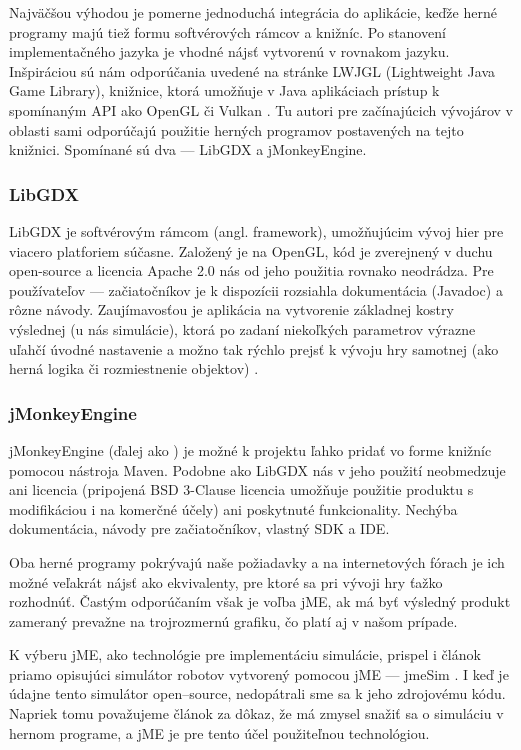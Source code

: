 Najväčšou výhodou je pomerne jednoduchá integrácia do aplikácie, keďže herné programy majú tiež formu softvérových rámcov a knižníc. Po stanovení implementačného jazyka je vhodné nájsť  vytvorenú v rovnakom jazyku. Inšpiráciou sú nám odporúčania uvedené na stránke LWJGL (Lightweight Java Game Library), knižnice, ktorá umožňuje v Java aplikáciach prístup k spomínaným API ako OpenGL či Vulkan \cite{LWJGL}. Tu autori pre začínajúcich vývojárov v oblasti sami odporúčajú použitie herných programov postavených na tejto knižnici. Spomínané sú dva --- LibGDX a jMonkeyEngine.

\subsubsection{LibGDX}
LibGDX je softvérovým rámcom (angl. framework), umožňujúcim vývoj hier pre viacero platforiem súčasne. Založený je na OpenGL, kód je zverejnený v duchu open-source a licencia Apache 2.0 nás od jeho použitia rovnako neodrádza. Pre používateľov --- začiatočníkov je k dispozícii rozsiahla dokumentácia (Javadoc) a rôzne návody. Zaujímavosťou je aplikácia na vytvorenie základnej kostry výslednej  (u nás simulácie), ktorá po zadaní niekoľkých parametrov výrazne uľahčí úvodné nastavenie a možno tak rýchlo prejsť k vývoju hry samotnej (ako herná logika či rozmiestnenie objektov) \cite{LibGDXProjectGenerator}.

\subsubsection{jMonkeyEngine}
jMonkeyEngine (ďalej ako ) je možné k projektu ľahko pridať vo forme knižníc pomocou nástroja Maven. Podobne ako LibGDX nás v jeho použití neobmedzuje ani licencia (pripojená BSD 3-Clause licencia umožňuje použitie produktu s modifikáciou i na komerčné účely) ani poskytnuté funkcionality. Nechýba dokumentácia, návody pre začiatočníkov, vlastný SDK a IDE.

Oba herné programy pokrývajú naše požiadavky a na internetových fórach je ich možné veľakrát nájsť ako ekvivalenty, pre ktoré sa pri vývoji hry ťažko rozhodnúť. Častým odporúčaním však je voľba jME, ak má byť výsledný produkt zameraný prevažne na trojrozmernú grafiku, čo platí aj v našom prípade.

K výberu jME, ako technológie pre implementáciu simulácie, prispel i článok priamo opisujúci simulátor robotov vytvorený pomocou jME --- jmeSim \cite{jmeSim}. I keď je údajne tento simulátor open--source, nedopátrali sme sa k jeho zdrojovému kódu. Napriek tomu považujeme článok za dôkaz, že má zmysel snažiť sa o simuláciu v hernom programe, a jME je pre tento účel použiteľnou technológiou.


